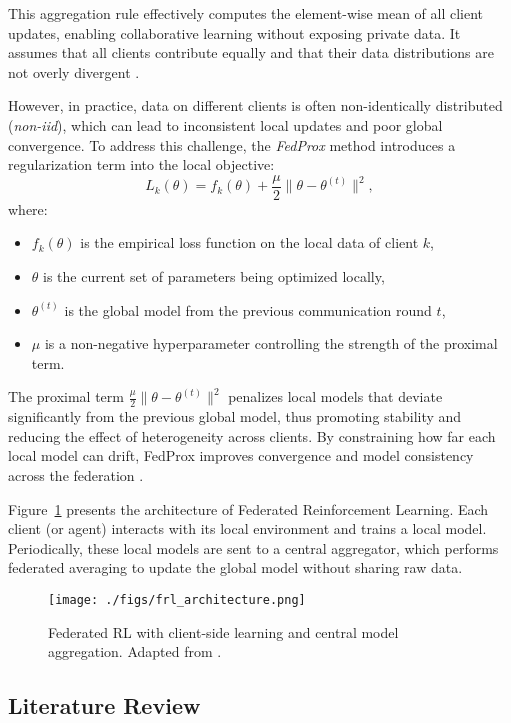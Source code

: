 \documentclass[12pt,a4paper,twoside,openany]{book}
\begin{document}
This aggregation rule effectively computes the element-wise mean of all client updates, enabling collaborative learning without exposing private data. It assumes that all clients contribute equally and that their data distributions are not overly divergent \cite{McMahan2016}.

However, in practice, data on different clients is often non-identically distributed (\emph{non-iid}), which can lead to inconsistent local updates and poor global convergence. To address this challenge, the \emph{FedProx} method introduces a regularization term into the local objective:
\[
L_k(\theta) = f_k(\theta) + \frac{\mu}{2} \|\theta - \theta^{(t)}\|^2,
\]
where:
\begin{itemize}
    \item \(f_k(\theta)\) is the empirical loss function on the local data of client \(k\),
    \item \(\theta\) is the current set of parameters being optimized locally,
    \item \(\theta^{(t)}\) is the global model from the previous communication round \(t\),
    \item \(\mu\) is a non-negative hyperparameter controlling the strength of the proximal term.
\end{itemize}

The proximal term \(\frac{\mu}{2} \|\theta - \theta^{(t)}\|^2\) penalizes local models that deviate significantly from the previous global model, thus promoting stability and reducing the effect of heterogeneity across clients. By constraining how far each local model can drift, FedProx improves convergence and model consistency across the federation \cite{Li2020}.

Figure~\ref{fig:frl_architecture} presents the architecture of Federated Reinforcement Learning. Each client (or agent) interacts with its local environment and trains a local model. Periodically, these local models are sent to a central aggregator, which performs federated averaging to update the global model without sharing raw data.
\begin{figure}[h]
\centering
\texttt{[image: ./figs/frl\_architecture.png]}
\captionsetup{font=small}
\caption{Federated RL with client-side learning and central model aggregation. Adapted from \cite{McMahan2016}.}
\label{fig:frl_architecture}
\end{figure}

\subsection*{Literature Review}
\end{document}
